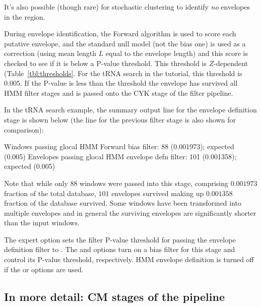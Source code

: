 \begin{sreoutput}
It's also possible (though rare) for stochastic clustering to identify
\emph{no} envelopes in the region.

During envelope identification, the Forward algorithm is used to score
each putative envelope, and the standard null model (not the bias one)
is used as a correction (using mean length $L$ equal to the envelope
length) and this score is checked to see if it is below a P-value
threshold. This threshold is $Z$-dependent
(Table~\ref{tbl:thresholds}. For the tRNA search in the tutorial, this
threshold is $0.005$. If the P-value is less than the threshold the
envelope has survived all HMM filter stages and is passed onto the CYK
stage of the filter pipeline. 

In the tRNA search example, the summary output line for the envelope
definition stage is shown below (the line for the previous filter stage is also
shown for comparison):

\begin{sreoutput}
Windows   passing glocal HMM Forward  bias filter:              88  (0.001973); expected (0.005)
Envelopes passing glocal HMM envelope defn filter:             101  (0.001358); expected (0.005)
\end{sreoutput}

Note that while only $88$ windows were passed into this stage,
comprising $0.001973$ fraction of the total database, $101$ envelopes
survived making up $0.001358$ fraction of the database survived. Some
windows have been transformed into multiple envelopes and in general
the surviving envelopes are significantly shorter than the input
windows. 

The  expert option sets the filter P-value threshold for
passing the envelope definition filter to . The  and
 options turn on a bias filter for this stage 
and control its P-value threshold, respectively. HMM envelope
definition is turned off if the  or 
options are used.

\subsection{In more detail: CM stages of the pipeline}


\end{sreoutput}
